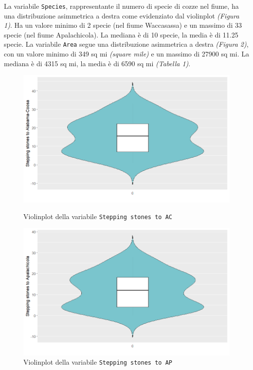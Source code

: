 \documentclass{article} %
\begin{document}
La variabile \texttt{Species}, rappresentante il numero di specie di cozze nel fiume, ha una distribuzione asimmetrica a destra come evidenziato dal violinplot \textit{(Figura 1)}. Ha un valore minimo di 2 specie (nel fiume Waccasassa) e un massimo di 33 specie (nel fiume Apalachicola). La mediana è di 10 specie, la media è di 11.25 specie.
La variabile \texttt{Area} segue una distribuzione asimmetrica a destra \textit{(Figura 2)}, con un valore minimo di 349 sq mi \textit{(square mile)} e un massimo di 27900 sq mi. La mediana è di 4315 sq mi, la media è di 6590 sq mi \textit{(Tabella 1)}.

\begin{figure}[H]
    \centering
    \begin{minipage}{0.49\textwidth}
        \centering
        \includegraphics[width=\textwidth]{immagini/vp_ac.png}
        \captionsetup{justification=centering}
        \caption{Violinplot della variabile \texttt{Stepping stones to AC}}
    \end{minipage}
    \hfill
    \begin{minipage}{0.49\textwidth}
        \centering
        \includegraphics[width=\textwidth]{immagini/vp_ap.png}
        \captionsetup{justification=centering}
        \caption{Violinplot della variabile \texttt{Stepping stones to AP}}
    \end{minipage}
\end{figure}
\end{document}

